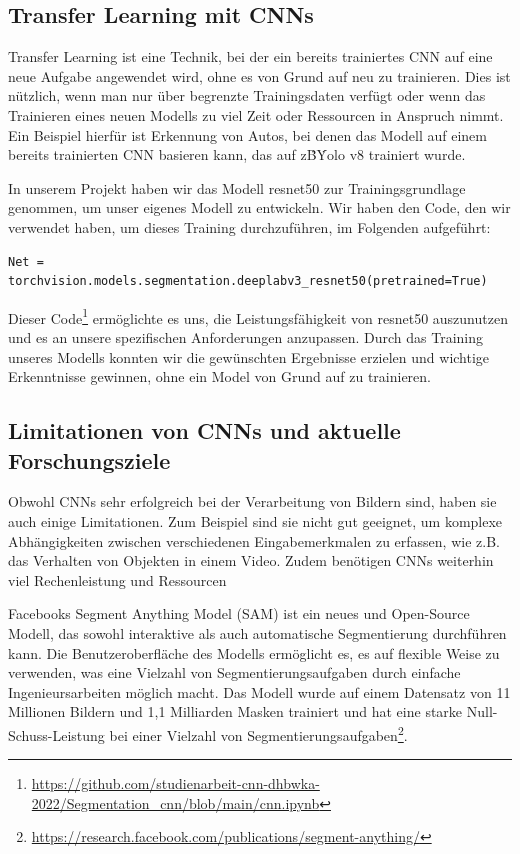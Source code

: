     \subsection{Transfer Learning mit CNNs}
    
        Transfer Learning ist eine Technik, bei der ein bereits trainiertes CNN auf eine neue Aufgabe angewendet wird, ohne es von Grund auf neu zu trainieren.      
        Dies ist nützlich, wenn man nur über begrenzte Trainingsdaten verfügt oder wenn das Trainieren eines neuen Modells zu viel Zeit oder Ressourcen in Anspruch nimmt.      
        Ein Beispiel hierfür ist Erkennung von Autos, bei denen das Modell auf einem bereits trainierten CNN basieren kann, das auf z\.B\. Yolo v8 trainiert wurde.

        In unserem Projekt haben wir das Modell resnet50 zur Trainingsgrundlage genommen, um unser eigenes Modell zu entwickeln. Wir haben den Code, den wir verwendet haben, um dieses Training durchzuführen, im Folgenden aufgeführt:

        \begin{lstlisting}
Net = torchvision.models.segmentation.deeplabv3_resnet50(pretrained=True)
        \end{lstlisting}

        Dieser Code\footnote{\url{https://github.com/studienarbeit-cnn-dhbwka-2022/Segmentation_cnn/blob/main/cnn.ipynb}} ermöglichte es uns, die Leistungsfähigkeit von resnet50 auszunutzen und es an unsere spezifischen Anforderungen anzupassen. Durch das Training unseres Modells konnten wir die gewünschten Ergebnisse erzielen und wichtige Erkenntnisse gewinnen, ohne ein Model von Grund auf zu trainieren.
        
    \subsection{Limitationen von CNNs und aktuelle Forschungsziele}

        Obwohl CNNs sehr erfolgreich bei der Verarbeitung von Bildern sind, haben sie auch einige Limitationen.      
        Zum Beispiel sind sie nicht gut geeignet, um komplexe Abhängigkeiten zwischen verschiedenen Eingabemerkmalen zu erfassen, wie z.B. das Verhalten von Objekten in einem Video.
        Zudem benötigen CNNs weiterhin viel Rechenleistung und Ressourcen

        Facebooks Segment Anything Model (SAM) ist ein neues und Open-Source Modell, das sowohl interaktive als auch automatische Segmentierung durchführen kann.
        Die Benutzeroberfläche des Modells ermöglicht es, es auf flexible Weise zu verwenden, was eine Vielzahl von Segmentierungsaufgaben durch einfache Ingenieursarbeiten möglich macht.
        Das Modell wurde auf einem Datensatz von 11 Millionen Bildern und 1,1 Milliarden Masken trainiert und hat eine starke Null-Schuss-Leistung bei einer Vielzahl von Segmentierungsaufgaben\footnote{\url{https://research.facebook.com/publications/segment-anything/}}.

